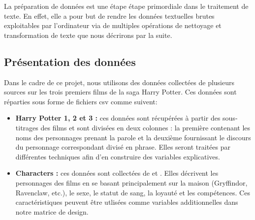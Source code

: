 \documentclass[11pt]{article}
\begin{document}
La préparation de données est une étape étape primordiale dans le traitement de texte. En effet, elle a pour but de rendre les données textuelles brutes exploitables par l'ordinateur via de multiples opérations de nettoyage et transformation de texte que nous décrirons par la suite.\par

\subsection{Présentation des données}


Dans le cadre de ce projet, nous utilisons des données collectées de plusieurs sources sur les trois premiers films de la saga Harry Potter. Ces données sont réparties sous forme de fichiers csv comme suivent:

\begin{itemize}
\renewcommand{\labelitemi}{$\bullet$}
    \item \textbf{Harry Potter 1, 2 et 3 :} ces données sont récupérées à partir des sous-titrages des films et sont divisées en deux colonnes : la première contenant les noms des personnages prenant la parole et la deuxième fournissant le discours du personnage correspondant divisé en phrase. Elles seront traitées par différentes techniques afin d'en construire des variables explicatives.

    \item \textbf{Characters :} ces données sont collectées de \cite{1} et \cite{2}. Elles décrivent les personnages des films en se basant principalement sur la  maison (Gryffindor, Ravenclaw, etc.), le sexe, le statut de sang, la loyauté et les compétences. Ces caractéristiques peuvent être utlisées comme variables additionnelles dans notre matrice de design.
\end{itemize}
\end{document}
